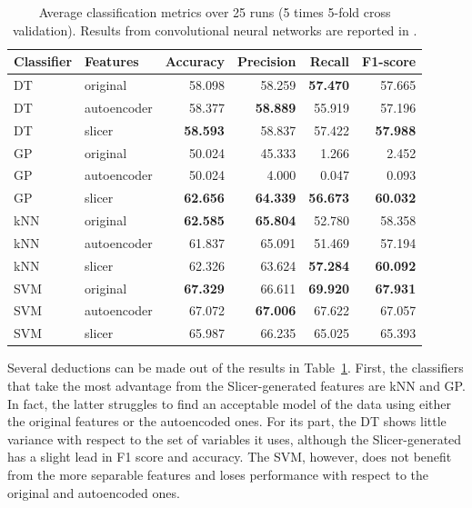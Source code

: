 \begin{table}[htbp]
    \centering
    
  \begin{tabular}{llrrrr}
\toprule
\bfseries Classifier & \bfseries Features & \bfseries Accuracy & \bfseries Precision & \bfseries Recall & \bfseries F1-score\\
\midrule
DT & original & 58.098 & 58.259 & \bfseries 57.470 & 57.665\\
DT & autoencoder & 58.377 & \bfseries 58.889 & 55.919 & 57.196\\
DT & slicer & \bfseries 58.593 & 58.837 & 57.422 & \bfseries 57.988\\
\addlinespace
GP & original & 50.024 & 45.333 & 1.266 & 2.452\\
GP & autoencoder & 50.024 & 4.000 & 0.047 & 0.093\\
GP & slicer & \bfseries 62.656 & \bfseries 64.339 & \bfseries 56.673 & \bfseries 60.032\\
\addlinespace
kNN & original & \bfseries 62.585 & \bfseries 65.804 & 52.780 & 58.358\\
kNN & autoencoder & 61.837 & 65.091 & 51.469 & 57.194\\
kNN & slicer & 62.326 & 63.624 & \bfseries 57.284 & \bfseries 60.092\\
\addlinespace
SVM & original & \bfseries 67.329 & 66.611 & \bfseries 69.920 & \bfseries 67.931\\
SVM & autoencoder & 67.072 & \bfseries 67.006 & 67.622 & 67.057\\
SVM & slicer & 65.987 & 66.235 & 65.025 & 65.393\\
\bottomrule
\end{tabular}

    \caption{Average classification metrics over 25 runs (5 times 5-fold cross validation). Results from convolutional neural networks are reported in \cite{9254002}.}
    \label{p7tab:meanspercl}
\end{table}

Several deductions can be made out of the results in Table~\ref{p7tab:meanspercl}. First, the classifiers that take the most advantage from the Slicer-generated features are kNN and GP. In fact, the latter struggles to find an acceptable model of the data using either the original features or the autoencoded ones. For its part, the DT shows little variance with respect to the set of variables it uses, although the Slicer-generated has a slight lead in F1 score and accuracy. The SVM, however, does not benefit from the more separable features and loses performance with respect to the original and autoencoded ones.

